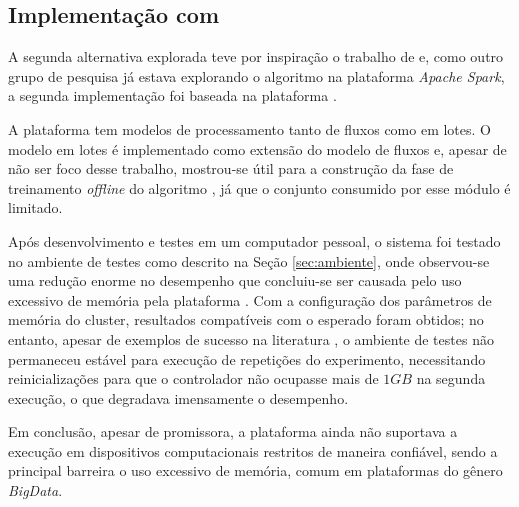 \subsection{Implementação com \flink}


A segunda alternativa explorada teve por inspiração o trabalho de
 e, como outro grupo de pesquisa já estava explorando
o algoritmo na plataforma \emph{Apache Spark}, a segunda implementação
foi baseada na plataforma \flink.

A plataforma \flink tem modelos de processamento tanto de fluxos como em lotes.
O modelo em lotes é implementado como extensão do modelo de fluxos e, apesar de
não ser foco desse trabalho, mostrou-se útil para a construção da fase de
treinamento \emph{offline} do algoritmo \minas, já que o conjunto consumido por
esse módulo é limitado.



Após desenvolvimento e testes em um computador pessoal, o sistema foi testado no
ambiente de testes como descrito na Seção \ref{sec:ambiente}, onde observou-se uma
redução enorme no desempenho que concluiu-se ser causada pelo uso excessivo de
memória pela plataforma \flink.
Com a configuração dos parâmetros de memória do cluster, resultados
compatíveis com o esperado foram obtidos; no entanto, apesar de exemplos de
sucesso na literatura
\cite{lee2017data,Greco2019wearableStream,battulga2020fogguru}, o ambiente de
testes não permaneceu estável para execução de repetições do experimento,
necessitando reinicializações para que o controlador não ocupasse mais de $1GB$
na segunda execução, o que degradava imensamente o desempenho.

Em conclusão, apesar de promissora, a plataforma \flink ainda não suportava a
execução em dispositivos computacionais restritos de maneira confiável, sendo a
principal barreira o uso excessivo de memória, comum em plataformas do gênero
\emph{BigData}.

